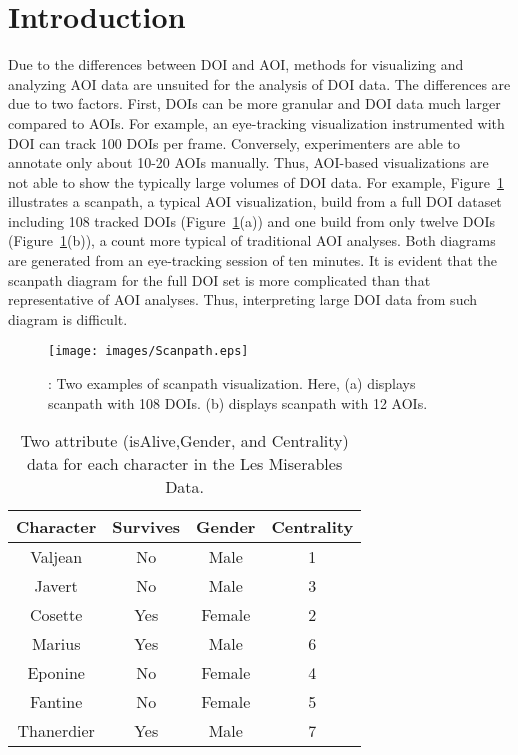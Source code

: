 \section{Introduction}
Due to the differences between DOI and AOI, methods for visualizing and analyzing AOI data are unsuited for the analysis of DOI data. The differences are due to two factors. First, DOIs can be more granular and DOI data much larger compared to AOIs. For example, an eye-tracking visualization instrumented with DOI can track 100 DOIs per frame. Conversely, experimenters are able to annotate only about 10-20 AOIs manually. Thus, AOI-based visualizations are not able to show the typically large volumes of DOI data. For example, Figure~\ref{fig:Scanpath} illustrates a scanpath, a typical AOI visualization,  build from a full DOI dataset including 108 tracked DOIs (Figure~\ref{fig:Scanpath}(a)) and one build from only twelve DOIs (Figure~\ref{fig:Scanpath}(b)), a count more typical of traditional AOI analyses. Both diagrams are generated from an eye-tracking session of ten minutes. It is evident that the scanpath diagram for the full DOI set is more complicated than that representative of AOI analyses. Thus, interpreting large DOI data from such diagram is difficult. 

\begin{figure}[htb]
  \centering
  \texttt{[image: images/Scanpath.eps]}
  \caption{: Two examples of scanpath visualization. Here, (a) displays scanpath with 108 DOIs. (b) displays scanpath with 12 AOIs. }
	\label{fig:Scanpath}
\end{figure}

\begin{table}[htbp]
	\centering
		\begin{tabular}{|c|c|c|c|}
				\hline
				\textbf{Character}	& \textbf{Survives} &	\textbf{Gender}	& \textbf{Centrality}\\\hline
			
				Valjean	& No	&Male	&1\\\hline
Javert	&No&	Male&	3\\\hline
Cosette 	&Yes	&Female&	2\\\hline
Marius	&Yes	&Male&	6\\\hline
Eponine	&No	&Female&	4\\\hline
Fantine	&No	&Female	&5\\\hline
Thanerdier	&Yes	&Male	&7\\\hline

		\end{tabular}
		\caption{Two attribute (isAlive,Gender, and Centrality) data for each character in the Les Miserables Data. }
		\label{tab:LesMiserablesAttribute}
\end{table}

